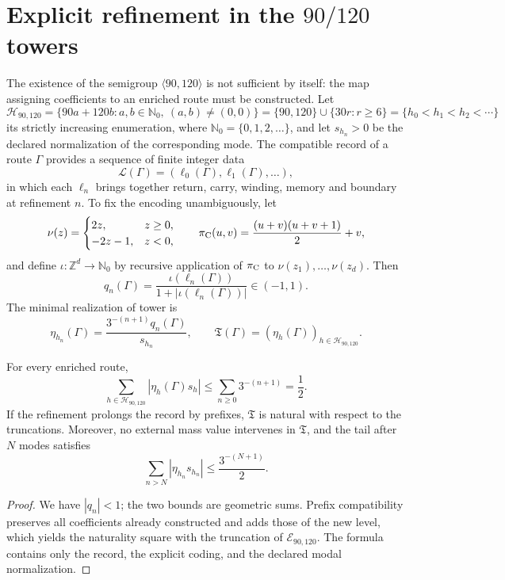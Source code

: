 \section{Explicit refinement in the \texorpdfstring{\(90/120\)}{90/120} towers}

The existence of the semigroup \(\langle90,120\rangle\) is not sufficient by itself:
the map assigning coefficients to an enriched route must be constructed. Let
\[
 \mathcal H_{90,120}
 =\{90a+120b:a,b\in\mathbb N_0,\ (a,b)\ne(0,0)\}
 =\{90,120\}\cup\{30r:r\geq6\}
 =\{h_0<h_1<h_2<\cdots\}
\]
its strictly increasing enumeration, where \(\mathbb N_0=\{0,1,2,\ldots\}\),
and let \(s_{h_n}>0\) be the declared normalization of the corresponding mode. The
compatible record of a route
\(\Gamma\) provides a sequence of finite integer data
\[
 \mathcal L(\Gamma)=(\ell_0(\Gamma),\ell_1(\Gamma),\ldots),
\]
in which each \(\ell_n\) brings together return, carry, winding, memory and boundary
at refinement \(n\). To fix the encoding unambiguously, let
\[
 \nu(z)=
 \begin{cases}2z,&z\geq0,\\-2z-1,&z<0,\end{cases}
 \qquad
 \pi_{\rm C}(u,v)=\frac{(u+v)(u+v+1)}2+v,
\]
and define \(\iota:\mathbb Z^d\to\mathbb N_0\) by recursive application of
\(\pi_{\rm C}\) to \(\nu(z_1),\ldots,\nu(z_d)\). Then
\[
 q_n(\Gamma)
 =\frac{\iota(\ell_n(\Gamma))}
 {1+|\iota(\ell_n(\Gamma))|}\in(-1,1).
\]
The minimal realization of tower is
\[
 \eta_{h_n}(\Gamma)
 =\frac{3^{-(n+1)}q_n(\Gamma)}{s_{h_n}},
 \qquad
 \mathfrak T(\Gamma)
 =(\eta_h(\Gamma))_{h\in\mathcal H_{90,120}}.
\]

\begin{theorem}
For every enriched route,
\[
 \sum_{h\in\mathcal H_{90,120}}|\eta_h(\Gamma)s_h|
 \leq\sum_{n\ge0}3^{-(n+1)}=\frac12.
\]
If the refinement prolongs the record by prefixes, \(\mathfrak T\) is natural
with respect to the truncations. Moreover, no external mass value intervenes
in \(\mathfrak T\), and the tail after \(N\) modes satisfies
\[
 \sum_{n>N}|\eta_{h_n}s_{h_n}|
 \leq\frac{3^{-(N+1)}}2.
\]
\end{theorem}

\begin{proof}
We have \(|q_n|<1\); the two bounds are geometric sums. Prefix
compatibility preserves all coefficients already constructed and adds those of the
new level, which yields the naturality square with the truncation of
\(\mathcal E_{90,120}\). The formula contains only the record, the explicit
coding, and the declared modal normalization.
\end{proof}

